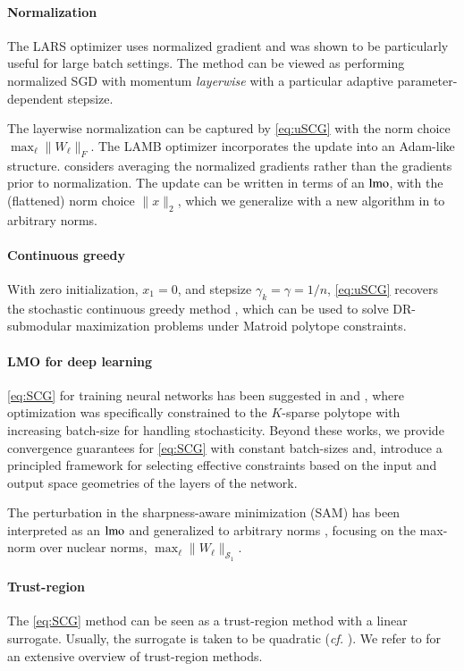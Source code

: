 \paragraph{Normalization}
The LARS optimizer \citep{you2017large} uses normalized gradient and was shown to be particularly useful for large batch settings.
The method can be viewed as performing normalized SGD with momentum \citep{cutkosky2020momentum} \emph{layerwise} with a particular adaptive parameter-dependent stepsize.

The layerwise normalization can be captured by \ref{eq:uSCG} with the norm choice $\max_\ell \|W_\ell\|_F$.
The LAMB optimizer \citep{you2019large} incorporates the update into an Adam-like structure.
\citet{zhao2020stochastic} considers averaging the normalized gradients rather than the gradients prior to normalization.
The update can be written in terms of an $\operatorname{lmo}$, with the (flattened) norm choice $\|x\|_2$, which we generalize with a new algorithm in  to arbitrary norms.
\paragraph{Continuous greedy}
With zero initialization, $x_1=0$, and stepsize $\gamma_k=\gamma=1/n$, \ref{eq:uSCG} recovers the stochastic continuous greedy method \citep{mokhtari2020stochastic,vondrak2008optimal}, which can be used to solve DR-submodular maximization problems under Matroid polytope constraints.

\paragraph{LMO for deep learning}
\ref{eq:SCG} for training neural networks has been suggested in \citet{pokutta2020deep} and \citet{lu2022learning}, where optimization was specifically constrained to the $K$-sparse polytope with increasing batch-size for handling stochasticity. Beyond these works, we provide convergence guarantees for \ref{eq:SCG} with constant batch-sizes and,  introduce a principled framework for selecting effective constraints based on the input and output space geometries of the layers of the network.

The perturbation in the sharpness-aware minimization (SAM) has been interpreted as an $\operatorname{lmo}$ and generalized to arbitrary norms \citep{pethicknusam}, focusing on the max-norm over nuclear norms, $\max_\ell \|W_\ell\|_{\mathcal{S}_1}$.

\paragraph{Trust-region}
The \ref{eq:SCG} method can be seen as a trust-region method with a linear surrogate. 
Usually, the surrogate is taken to be quadratic (\textit{cf.} \citet[Ch. 4]{wright2006numerical}).
We refer to \citet{conn2000trust} for an extensive overview of trust-region methods.
